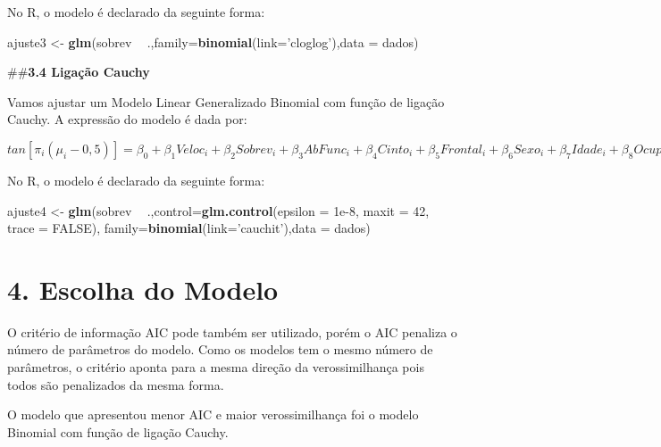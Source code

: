 \documentclass[
]{article}
\newenvironment{Shaded}{\begin{snugshade}}{\end{snugshade}}
\newcommand{\DataTypeTok}[1]{\textcolor[rgb]{0.13,0.29,0.53}{#1}}
\newcommand{\DecValTok}[1]{\textcolor[rgb]{0.00,0.00,0.81}{#1}}
\newcommand{\FloatTok}[1]{\textcolor[rgb]{0.00,0.00,0.81}{#1}}
\newcommand{\KeywordTok}[1]{\textcolor[rgb]{0.13,0.29,0.53}{\textbf{#1}}}
\newcommand{\NormalTok}[1]{#1}
\newcommand{\OperatorTok}[1]{\textcolor[rgb]{0.81,0.36,0.00}{\textbf{#1}}}
\newcommand{\OtherTok}[1]{\textcolor[rgb]{0.56,0.35,0.01}{#1}}
\newcommand{\StringTok}[1]{\textcolor[rgb]{0.31,0.60,0.02}{#1}}
\begin{document}
No R, o modelo é declarado da seguinte forma:

\begin{Shaded}
\begin{Highlighting}[]
\NormalTok{ajuste3 <-}\StringTok{ }\KeywordTok{glm}\NormalTok{(sobrev }\OperatorTok{~}\StringTok{ }\NormalTok{.,}\DataTypeTok{family=}\KeywordTok{binomial}\NormalTok{(}\DataTypeTok{link=}\StringTok{'cloglog'}\NormalTok{),}\DataTypeTok{data =}\NormalTok{ dados)}
\end{Highlighting}
\end{Shaded}

\#\#\textbf{3.4 Ligação Cauchy}

Vamos ajustar um Modelo Linear Generalizado Binomial com função de
ligação Cauchy. A expressão do modelo é dada por:

\(tan[\pi_i(\mu_i- 0,5)] = \beta_0 + \beta_1 Veloc_i + \beta_2 Sobrev_i + \beta_3 AbFunc_i + \beta_4 Cinto_i + \beta_5 Frontal_i + \beta_6 Sexo_i + \beta_7 Idade_i + \beta_8 Ocupantes_i + \beta_9 Grav_i\)

No R, o modelo é declarado da seguinte forma:

\begin{Shaded}
\begin{Highlighting}[]
\NormalTok{ajuste4 <-}\StringTok{ }\KeywordTok{glm}\NormalTok{(sobrev }\OperatorTok{~}\StringTok{ }\NormalTok{.,}\DataTypeTok{control=}\KeywordTok{glm.control}\NormalTok{(}\DataTypeTok{epsilon =} \FloatTok{1e-8}\NormalTok{, }\DataTypeTok{maxit =} \DecValTok{42}\NormalTok{, }
                                           \DataTypeTok{trace =} \OtherTok{FALSE}\NormalTok{), }\DataTypeTok{family=}\KeywordTok{binomial}\NormalTok{(}\DataTypeTok{link=}\StringTok{'cauchit'}\NormalTok{),}\DataTypeTok{data =}\NormalTok{ dados)}
\end{Highlighting}
\end{Shaded}

\hypertarget{escolha-do-modelo}{%
\section{4. Escolha do Modelo}\label{escolha-do-modelo}}

O critério de informação AIC pode também ser utilizado, porém o AIC
penaliza o número de parâmetros do modelo. Como os modelos tem o mesmo
número de parâmetros, o critério aponta para a mesma direção da
verossimilhança pois todos são penalizados da mesma forma.

O modelo que apresentou menor AIC e maior verossimilhança foi o modelo
Binomial com função de ligação Cauchy.
\end{document}
